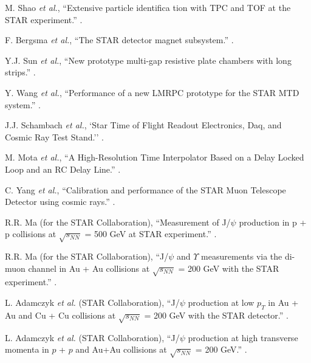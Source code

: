 \begin{thebibliography}{10}
M. Shao {\it et al.},
\newblock ``Extensive particle identiﬁca tion with TPC and TOF at the STAR experiment.''
.

F. Bergsma {\it et al.},
\newblock ``The STAR detector magnet subsystem.''
.

Y.J. Sun {\it et al.},
\newblock ``New prototype multi-gap resistive plate chambers with long strips.''
.

Y. Wang {\it et al.},
\newblock ``Performance of a new LMRPC prototype for the STAR MTD system.''
.

J.J. Schambach {\it et al.},
\newblock `Star Time of Flight Readout Electronics, Daq, and Cosmic Ray Test Stand.''
.

M. Mota {\it et al.},
\newblock ``A High-Resolution Time Interpolator Based on a Delay Locked Loop and an RC Delay Line.''
.

C. Yang {\it et al.},
\newblock ``Calibration and performance of the STAR Muon Telescope Detector using cosmic rays.''
.

R.R. Ma (for the STAR Collaboration),
\newblock ``Measurement of J/$\psi$ production in p + p collisions at $\sqrt{s_{NN}}$ = 500 GeV at STAR experiment.''
.

R.R. Ma (for the STAR Collaboration),
\newblock ``J/$\psi$ and $\varUpsilon$ measurements via the di-muon channel in Au + Au collisions at $\sqrt{s_{NN}}$ = 200 GeV with the STAR experiment.''
.

 L. Adamczyk {\it et al.} (STAR Collaboration),
\newblock ``J/$\psi$ production at low $p_{T}$ in Au + Au and Cu + Cu collisions at $\sqrt{s_{NN}}$ = 200 GeV with the STAR detector.''
.

 L. Adamczyk {\it et al.} (STAR Collaboration),
\newblock ``J/$\psi$ production at high transverse momenta in $p$ + $p$ and Au+Au collisions at $\sqrt{s_{NN}}$ = 200 GeV.''
.


\end{thebibliography}
